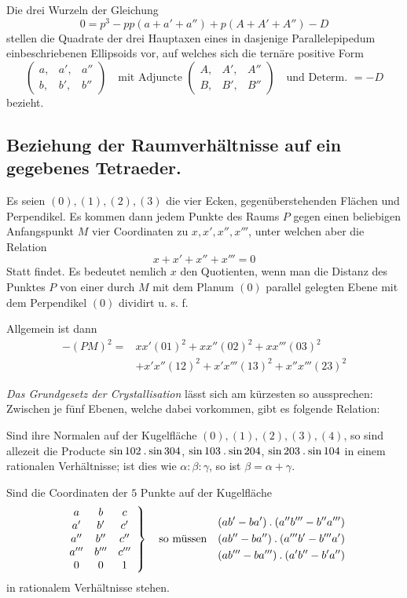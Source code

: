 Die drei Wurzeln der Gleichung
\[
0=p^3-pp(a+a'+a'')+p(A+A'+A'')-D
\]
stellen die Quadrate der drei Hauptaxen eines in dasjenige Parallelepipedum einbeschriebenen Ellipsoids vor, auf welches sich die ternäre positive Form
\[
\left(\begin{smallmatrix}a,&a',&a''\\b,&b',&b''\end{smallmatrix}\right)
\quad\text{mit Adjuncte }\left(\begin{smallmatrix}A,&A',&A''\\B,&B',&B''\end{smallmatrix}\right)
\quad\text{und Determ. }=-D
\]
bezieht.

\subsection*{Beziehung der Raumverhältnisse auf ein gegebenes Tetraeder.}
Es seien $(0),(1),(2),(3)$ die vier Ecken, gegenüberstehenden Flächen und Perpendikel. Es kommen dann jedem Punkte des Raums $P$ gegen einen beliebigen Anfangspunkt $M$ vier Coordinaten zu $x,x',x'',x'''$, unter welchen aber die Relation
\[
x+x'+x''+x'''=0
\]
Statt findet. Es bedeutet nemlich $x$ den Quotienten, wenn man die Distanz des
%
Punktes $P$ von einer durch $M$ mit dem Planum $(0)$ parallel gelegten Ebene mit dem Perpendikel $(0)$ dividirt u. s. f.

Allgemein ist dann
\[
\begin{aligned}
-(PM)^2={}&xx'(01)^2+xx''(02)^2+xx'''(03)^2\\
&+x'x''(12)^2+x'x'''(13)^2+x''x'''(23)^2
\end{aligned}
\]

\emph{Das Grundgesetz der Crystallisation} lässt sich am kürzesten so aussprechen: Zwischen je fünf Ebenen, welche dabei vorkommen, gibt es folgende Relation:

Sind ihre Normalen auf der Kugelfläche $(0),(1),(2),(3),(4)$, so sind allezeit die Producte $\sin102\mathbin{.}\sin304$, $\sin103\mathbin{.}\sin204$, $\sin203\mathbin{.}\sin104$ in einem rationalen Verhältnisse; ist dies wie $\alpha:\beta:\gamma$, so ist $\beta=\alpha+\gamma$.

Sind die Coordinaten der $5$ Punkte auf der Kugelfläche
\[
\left.\begin{array}{ccc}
a&b&c\\a'&b'&c'\\a''&b''&c''\\a'''&b'''&c'''\\0&0&1
\end{array}\right\}
\quad\text{so müssen}\quad
\begin{gathered}
(ab'-ba')\mathbin{.}(a''b'''-b''a''')\\
(ab''-ba'')\mathbin{.}(a'''b'-b'''a')\\
(ab'''-ba''')\mathbin{.}(a'b''-b'a'')
\end{gathered}
\]
in rationalem Verhältnisse stehen.


